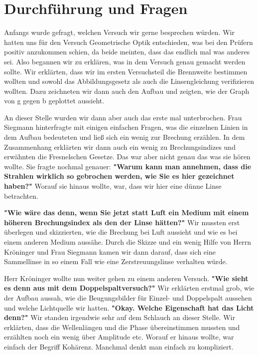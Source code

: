 \section{Durchführung und Fragen}

\noindent Anfangs wurde gefragt, welchen Versuch wir gerne besprechen würden. Wir hatten uns für den Versuch Geometrische Optik entschieden, was bei den Prüfern positiv anzukommen schien, da beide meinten, dass das endlich mal was anderes sei. 
Also begannen wir zu erklären, was in dem Versuch genau gemacht werden sollte. Wir erklärten, dass wir im ersten Versuchsteil die Brennweite bestimmen wollten und sowohl das Abbildungsgesetz als auch die Linsengleichung verifizieren wollten.
Dazu zeichneten wir dann auch den Aufbau und zeigten, wie der Graph von g gegen b geplottet aussieht. 

\noindent An dieser Stelle wurden wir dann aber auch das erste mal unterbrochen. Frau Siegmann hinterfragte mit einigen einfachen Fragen, was die einzelnen Linien in dem Aufbau bedeuteten und ließ sich ein wenig zur Brechung erzählen. 
In dem Zusammenhang erklärten wir dann auch ein wenig zu Brechungsindizes und erwähnten die Fresnelschen Gesetze. 
Das war aber nicht genau das was sie hören wollte. Sie fragte nochmal genauer: \textbf{"Warum kann man annehmen, dass die Strahlen wirklich so gebrochen werden, wie Sie es hier gezeichnet haben?"} 
Worauf sie hinaus wollte, war, dass wir hier eine dünne Linse betrachten.

\noindent \textbf{"Wie wäre das denn, wenn Sie jetzt statt Luft ein Medium mit einem höheren Brechungsindex als den der Linse hätten?"}
Wir mussten erst überlegen und skizzierten, wie die Brechung bei Luft aussieht und wie es bei einem anderen Medium aussähe. 
Durch die Skizze und ein wenig Hilfe von Herrn Kröninger und Frau Siegmann kamen wir dann darauf, dass sich eine Sammellinse in so einem Fall wie eine Zerstreuungslinse verhalten würde.

\noindent Herr Kröninger wollte nun weiter gehen zu einem anderen Versuch. \textbf{"Wie sieht es denn aus mit dem Doppelspaltversuch?"} 
Wir erklärten erstmal grob, wie der Aufbau aussah, wie die Beugungsbilder für Einzel- und Doppelspalt aussehen und welche Lichtquelle wir hatten. 
\textbf{"Okay. Welche Eigenschaft hat das Licht denn?"}
Wir standen irgendwie sehr auf dem Schlauch an dieser Stelle. Wir erklärten, dass die Wellenlängen und die Phase übereinstimmen mussten und erzählten noch ein wenig über Amplitude etc. Worauf er hinaus wollte, war einfach der Begriff Kohärenz. 
Manchmal denkt man einfach zu kompliziert.

